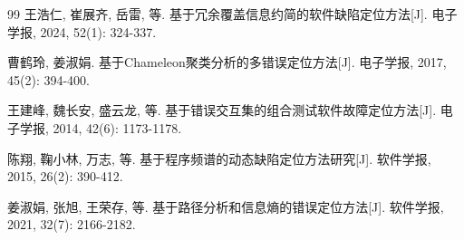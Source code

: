 \documentclass[twocolumn,10pt]{ctexart}
\begin{document}
\begin{thebibliography}{99}
 王浩仁, 崔展齐, 岳雷, 等. 基于冗余覆盖信息约简的软件缺陷定位方法[J]. 电子学报, 2024, 52(1): 324-337.

 曹鹤玲, 姜淑娟. 基于Chameleon聚类分析的多错误定位方法[J]. 电子学报, 2017, 45(2): 394-400.

 王建峰, 魏长安, 盛云龙, 等. 基于错误交互集的组合测试软件故障定位方法[J]. 电子学报, 2014, 42(6): 1173-1178.

 陈翔, 鞠小林, 万志, 等. 基于程序频谱的动态缺陷定位方法研究[J]. 软件学报, 2015, 26(2): 390-412.

 姜淑娟, 张旭, 王荣存, 等. 基于路径分析和信息熵的错误定位方法[J]. 软件学报, 2021, 32(7): 2166-2182.

\end{thebibliography}
\end{document}
